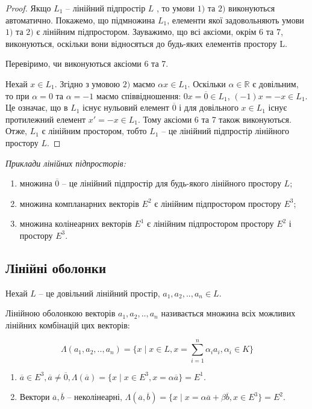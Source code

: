\begin{proof}
	Якщо $L_1$ -- лінійний підпростір $L$ , то умови $1)$ та $2)$ виконуються
	автоматично. Покажемо, що підмножина $L_1$, елементи якої задовольняють умови
	$1)$ та $2)$ є лінійним підпростором. Зауважимо, що всі аксіоми, окрім 6 та 7,
	виконуються, оскільки вони відносяться до будь-яких елементів простору L.
	
	Перевіримо, чи виконуються аксіоми 6 та 7.
	
	Нехай $x \in L_1$. Згідно з умовою $2)$ маємо $\alpha x \in L_1$. Оскільки $\alpha \in \mathbb{R}$ є довільним,
	то при $\alpha = 0$ та $\alpha = -1$ маємо співвідношення: $0x = \overline{0} \in L_1$, $(-1)x = -x \in L_1$. Це
	означає, що в $L_1$ існує нульовий елемент $\overline{0}$ і для довільного $x \in L_1$ існує
	протилежний елемент $x' = -x \in L_1$. Тому аксіоми 6 та 7 також виконуються. Отже,
	$L_1$ є лінійним простором, тобто $L_1$ -- це лінійний підпростір лінійного простору $L$.
\end{proof}

\textit{Приклади лінійних підпросторів:}
\begin{enumerate}
	\item множина ${\overline{0}}$ -- це лінійний підпростір для будь-якого лінійного простору $L$;
	\item множина компланарних векторів $E^2$ є лінійним підпростором простору $E^3$;
	\item множина колінеарних векторів $E^1$ є лінійним підпростором простору $E^2$ і простору $E^3$. 
\end{enumerate}

\subsection{Лінійні оболонки}

Нехай $L$ -- це довільний лінійний простір, $a_1, a_2, ..,a_n \in L$.

\begin{definition}
	Лінійною оболонкою векторів $a_1, a_2, ..,a_n$ називається множина всіх
	можливих лінійних комбінацій цих векторів:
	
	$$\Lambda(a_1, a_2, ..,a_n) = \{x \mid x \in L, x = \sum\limits_{i=1}^n \alpha_i a_i, \alpha_i \in K\}$$
\end{definition}

\begin{example}
	\begin{enumerate}
		\item $\overline{a} \in E^3, \overline{a} \neq \overline{0}, \Lambda(\overline{a}) = \{x \mid x \in E^3, x = \alpha \overline{a}\} = E^1$.
		\item Вектори $\overline{a}, \overline{b}$ -- неколінеарні, $\Lambda(\overline{a}, \overline{b}) = \{x \mid x = \alpha \overline{a} + \beta \overline{b}, x \in E^3\} = E^2$.
	\end{enumerate}
\end{example}



